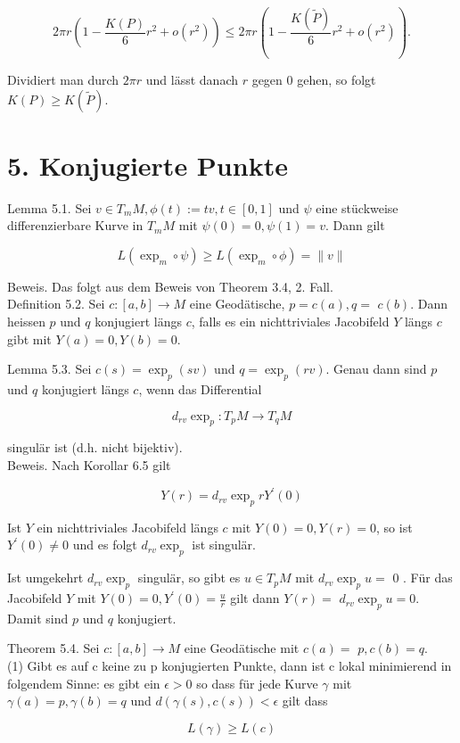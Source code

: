 \documentclass[10pt, letterpaper]{article}
\begin{document}
$$
2 \pi r\left(1-\frac{K(P)}{6} r^{2}+o\left(r^{2}\right)\right) \leq 2 \pi r\left(1-\frac{K(\tilde{P})}{6} r^{2}+o\left(r^{2}\right)\right) .
$$

Dividiert man durch $2 \pi r$ und lässt danach $r$ gegen 0 gehen, so folgt $K(P) \geq K(\tilde{P})$.

\section*{5. Konjugierte Punkte}
Lemma 5.1. Sei $v \in T_{m} M, \phi(t):=t v, t \in[0,1]$ und $\psi$ eine stückweise differenzierbare Kurve in $T_{m} M$ mit $\psi(0)=0, \psi(1)=v$. Dann gilt

$$
L\left(\exp _{m} \circ \psi\right) \geq L\left(\exp _{m} \circ \phi\right)=\|v\|
$$

Beweis. Das folgt aus dem Beweis von Theorem 3.4, 2. Fall.\\
Definition 5.2. Sei $c:[a, b] \rightarrow M$ eine Geodätische, $p=c(a), q=$ $c(b)$. Dann heissen $p$ und $q$ konjugiert längs $c$, falls es ein nichttriviales Jacobifeld $Y$ längs $c$ gibt mit $Y(a)=0, Y(b)=0$.

Lemma 5.3. Sei $c(s)=\exp _{p}(s v)$ und $q=\exp _{p}(r v)$. Genau dann sind $p$ und $q$ konjugiert längs $c$, wenn das Differential

$$
d_{r v} \exp _{p}: T_{p} M \rightarrow T_{q} M
$$

singulär ist (d.h. nicht bijektiv).\\
Beweis. Nach Korollar 6.5 gilt

$$
Y(r)=d_{r v} \exp _{p} r Y^{\prime}(0)
$$

Ist $Y$ ein nichttriviales Jacobifeld längs $c$ mit $Y(0)=0, Y(r)=0$, so ist $Y^{\prime}(0) \neq 0$ und es folgt $d_{r v} \exp _{p}$ ist singulär.

Ist umgekehrt $d_{r v} \exp _{p}$ singulär, so gibt es $u \in T_{p} M$ mit $d_{r v} \exp _{p} u=$ 0 . Für das Jacobifeld $Y$ mit $Y(0)=0, Y^{\prime}(0)=\frac{u}{r}$ gilt dann $Y(r)=$ $d_{r v} \exp _{p} u=0$. Damit sind $p$ und $q$ konjugiert.

Theorem 5.4. Sei $c:[a, b] \rightarrow M$ eine Geodätische mit $c(a)=$ $p, c(b)=q$.\\
(1) Gibt es auf c keine zu p konjugierten Punkte, dann ist c lokal minimierend in folgendem Sinne: es gibt ein $\epsilon>0$ so dass für jede Kurve $\gamma$ mit $\gamma(a)=p, \gamma(b)=q$ und $d(\gamma(s), c(s))<\epsilon$ gilt dass

$$
L(\gamma) \geq L(c)
$$
\end{document}

